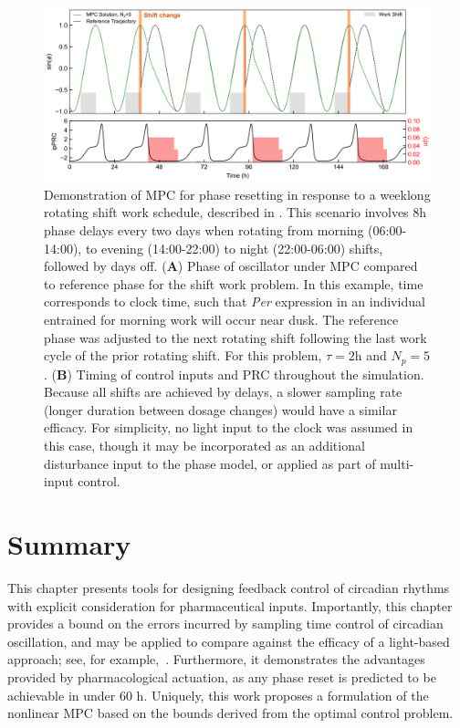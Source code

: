 \begin{figure}[p]
    \begin{center}
    \includegraphics[width=\textwidth]{chap6/figures/figure_8.png}
\end{center}
      \caption{\label{fig:mpc_demo2}
      Demonstration of MPC for phase resetting in response to a weeklong rotating shift work schedule, described in \cite{Vetter2015}. This scenario involves 8h phase delays every two days when rotating from morning (06:00-14:00), to evening (14:00-22:00) to night (22:00-06:00) shifts, followed by days off. (\textbf{A}) Phase of oscillator under MPC compared to reference phase for the shift work problem. In this example, time corresponds to clock time, such that \textit{Per} expression in an individual entrained for morning work will occur near dusk. The reference phase was adjusted to the next rotating shift following the last work cycle of the prior rotating shift. For this problem, $\tau=2$h and $N_p=5$. (\textbf{B}) Timing of control inputs and PRC throughout the simulation. Because all shifts are achieved by delays, a slower sampling rate (longer duration between dosage changes) would have a similar efficacy. For simplicity, no light input to the clock was assumed in this case, though it may be incorporated as an additional disturbance input to the phase model, or applied as part of multi-input control.
  }
\end{figure}

\clearpage
\section{Summary}
\label{sec:conc6}
This chapter presents tools for designing feedback control of circadian rhythms with explicit consideration for pharmaceutical inputs.
Importantly, this chapter provides a bound on the errors incurred by sampling time control of circadian oscillation, and may be applied to compare against the efficacy of a light-based approach; see, for example,~\cite{Qiao2017}.
Furthermore, it demonstrates the advantages provided by pharmacological actuation, as any phase reset is predicted to be achievable in under 60 h.
Uniquely, this work proposes a formulation of the nonlinear MPC based on the bounds derived from the optimal control problem.

